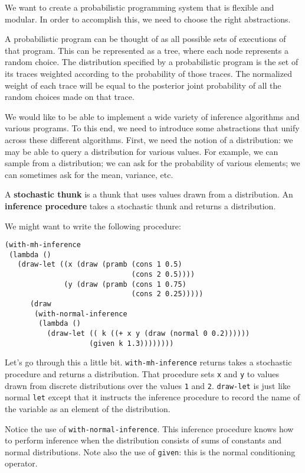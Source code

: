 \documentclass{article}
\begin{document}
We want to create a probabilistic programming system that is flexible
and modular. In order to accomplish this, we need to choose the right
abstractions.

A probabilistic program can be thought of as all possible sets of
executions of that program. This can be represented as a tree, where
each node represents a random choice. The distribution specified by a
probabilistic program is the set of its traces weighted according to
the probability of those traces. The normalized weight of each trace
will be equal to the posterior joint probability of all the random
choices made on that trace.

We would like to be able to implement a wide variety of inference
algorithms and various programs. To this end, we need to introduce
some abstractions that unify across these different algorithms. First,
we need the notion of a distribution: we may be able to query a
distribution for various values. For example, we can sample from a
distribution; we can ask for the probability of various elements; we
can sometimes ask for the mean, variance, etc. 

A \textbf{stochastic thunk} is a thunk that uses values drawn from a
distribution. An \textbf{inference procedure} takes a stochastic thunk
and returns a distribution. 

We might want to write the following procedure: 

\begin{verbatim}
(with-mh-inference
 (lambda ()
   (draw-let ((x (draw (pramb (cons 1 0.5)
                              (cons 2 0.5))))
              (y (draw (pramb (cons 1 0.75)
                              (cons 2 0.25)))))
      (draw 
       (with-normal-inference
        (lambda ()
          (draw-let (( k ((+ x y (draw (normal 0 0.2))))))
                    (given k 1.3))))))))
\end{verbatim}

Let's go through this a little bit. \verb+with-mh-inference+ returns
takes a stochastic procedure and returns a distribution. That
procedure sets \verb+x+ and \verb+y+ to values drawn from discrete
distributions over the values \verb+1+ and \verb+2+. \verb+draw-let+
is just like normal \verb+let+ except that it instructs the inference
procedure to record the name of the variable as an element of the
distribution. 

Notice the use of \verb+with-normal-inference+. This inference
procedure knows how to perform inference when the distribution
consists of sums of constants and normal distributions. Note also the
use of \verb+given+: this is the normal conditioning operator.
\end{document}
